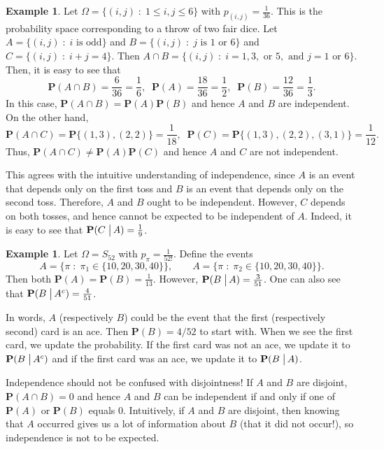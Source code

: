 \documentclass[preprint,  11pt]{amsart}
\newcommand{\para}[1]{\vspace{4mm}\noindent{\bfseries #1:}}
\theoremstyle{plain} %
\theoremstyle{definition} %
\newtheorem{example}[theorem]{Example}
\begin{document}
\begin{example} Let $\Omega=\{(i,j){\; : \;} 1\le i,j\le 6\}$ with $p_{(i,j)}=\frac{1}{36}$. This is the probability space corresponding to a throw of two fair dice. Let $A=\{(i,j){\; : \;} i\mbox{ is odd}\}$ and $B=\{(i,j){\; : \;} j \mbox{ is }1\mbox{ or }6\}$ and $C=\{(i,j){\; : \;} i+j=4\}$. Then $A\cap B=\{(i,j){\; : \;} i=1,3,\mbox{ or }5, \mbox{ and }j=1\mbox{ or }6\}$. Then, it is easy to see that
$$
\mathbf{P}(A\cap B)=\frac{6}{36}=\frac{1}{6}, \;\; \mathbf{P}(A)=\frac{18}{36}=\frac{1}{2}, \;\; \mathbf{P}(B)=\frac{12}{36}=\frac{1}{3}.
$$
In this case, $\mathbf{P}(A\cap B)=\mathbf{P}(A)\mathbf{P}(B)$ and hence $A$ and $B$ are independent. On the other hand, 
$$
\mathbf{P}(A\cap C)=\mathbf{P}\{(1,3),(2,2)\}=\frac{1}{18}, \;\; \mathbf{P}(C)=\mathbf{P}\{(1,3),(2,2),(3,1)\}=\frac{1}{12}.
$$
Thus, $\mathbf{P}(A\cap C)\not=\mathbf{P}(A)\mathbf{P}(C)$ and hence $A$ and $C$ are not independent. 

This agrees with the intuitive understanding of independence, since $A$ is an event that depends only on the first toss and $B$ is an event that depends only on the second toss. Therefore, $A$ and $B$ ought to be independent. However, $C$ depends on both tosses, and hence cannot be expected to be independent of $A$. Indeed, it is easy to see that $\mathbf{P}(C \left.\vphantom{\hbox{\large (}}\right| A)=\frac{1}{9}$. 
\end{example}

\begin{example} Let $\Omega=S_{52}$ with $p_{\pi}=\frac{1}{52!}$. Define the events
$$
A=\{\pi{\; : \;} \pi_{1}\in \{10,20,30,40\}\}, \qquad A=\{\pi{\; : \;} \pi_{2}\in \{10,20,30,40\}\}.
$$
Then both $\mathbf{P}(A)=\mathbf{P}(B)=\frac{1}{13}$. However, $\mathbf{P}(B\left.\vphantom{\hbox{\large (}}\right| A)=\frac{3}{51}$. One can also see that $\mathbf{P}(B \left.\vphantom{\hbox{\large (}}\right| A^{c})=\frac{4}{51}$.

In words, $A$ (respectively $B$) could be the event that the first (respectively second) card is an ace. Then $\mathbf{P}(B)=4/52$ to start with. When we see the first card, we update the probability. If the first card was not an ace, we update it to $\mathbf{P}(B\left.\vphantom{\hbox{\large (}}\right| A^{c})$ and if the first card was an ace, we update it to  $\mathbf{P}(B\left.\vphantom{\hbox{\large (}}\right| A)$.
\end{example}


\para{Caution} Independence should not be confused with disjointness! If $A$ and $B$ are disjoint, $\mathbf{P}(A\cap B)=0$ and hence $A$ and $B$ can be independent if and only if one of $\mathbf{P}(A)$ or $\mathbf{P}(B)$ equals $0$. Intuitively, if $A$ and $B$ are disjoint, then knowing that $A$ occurred gives us a lot of information about $B$ (that it did not occur!), so independence is not to be expected. 
\end{document}
